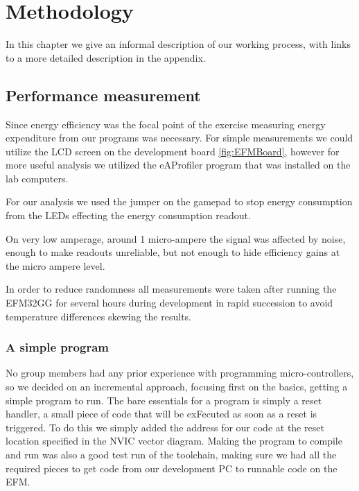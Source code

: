 \chapter{Methodology}

In this chapter we give an informal description of our working process, with links to a more detailed description in the appendix.

%

\section{Performance measurement}

Since energy efficiency was the focal point of the exercise measuring energy expenditure from our programs was necessary. For simple measurements we could utilize the LCD screen on the development board \ref{fig:EFMBoard}, however for more useful analysis we utilized the eAProfiler program that was installed on the lab computers. 

For our analysis we used the jumper on the gamepad to stop energy consumption from the LEDs effecting the energy consumption readout. 

On very low amperage, around 1 micro-ampere the signal was affected by noise, enough to make readouts unreliable, but not enough to hide efficiency gains at the micro ampere level.

In order to reduce randomness all measurements were taken after running the EFM32GG for several hours during development in rapid succession to avoid temperature differences skewing the results.

\subsection{A simple program}

No group members had any prior experience with programming micro-controllers, so we decided on an incremental approach, focusing first on the basics, getting a simple program to run. The bare essentials for a program is simply a reset handler, a small piece of code that will be exFecuted as soon as a reset is triggered. To do this we simply added the address for our code at the reset location specified in the NVIC vector diagram. Making the program to compile and run was also a good test run of the toolchain, making sure we had all the required pieces to get code from our development PC to runnable code on the EFM. 

